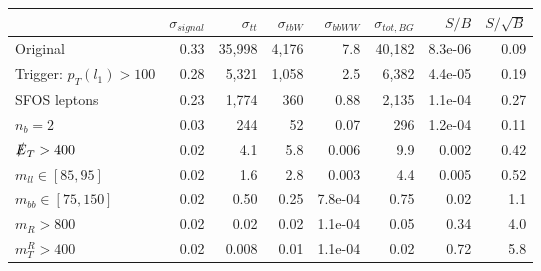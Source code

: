 \begin{tabular}{lrrrrrrr}
\toprule
{} &  $\sigma_{signal}$     &  $\sigma_{tt}$     &  $\sigma_{tbW}$ &  $\sigma_{bbWW}$ &  $\sigma_{tot, BG}$ &   $S/B$ &  $S/\sqrt{B}$ \\
\midrule
Original                    &               0.33 &         35,998 &           4,176 &              7.8 &             40,182 & 8.3e-06 &          0.09 \\
Trigger: $p_T(l_1) > 100$   &               0.28 &          5,321 &           1,058 &              2.5 &              6,382 & 4.4e-05 &          0.19 \\
\textsc{SFOS} leptons       &               0.23 &          1,774 &             360 &             0.88 &              2,135 & 1.1e-04 &          0.27 \\
$n_b = 2$                   &               0.03 &            244 &              52 &             0.07 &                296 & 1.2e-04 &          0.11 \\
$\slashed{E}_T > 400$       &               0.02 &            4.1 &             5.8 &            0.006 &                9.9 &   0.002 &          0.42 \\
$m_{ll} \in [85,95]$        &               0.02 &            1.6 &             2.8 &            0.003 &                4.4 &   0.005 &          0.52 \\
$m_{bb} \in [75,150]$       &               0.02 &           0.50 &            0.25 &          7.8e-04 &               0.75 &    0.02 &           1.1 \\
$m_{R} > 800$               &               0.02 &           0.02 &            0.02 &          1.1e-04 &               0.05 &    0.34 &           4.0 \\
$m_{T}^{R} > 400$           &               0.02 &          0.008 &            0.01 &          1.1e-04 &               0.02 &    0.72 &           5.8 \\
\bottomrule
\end{tabular}

